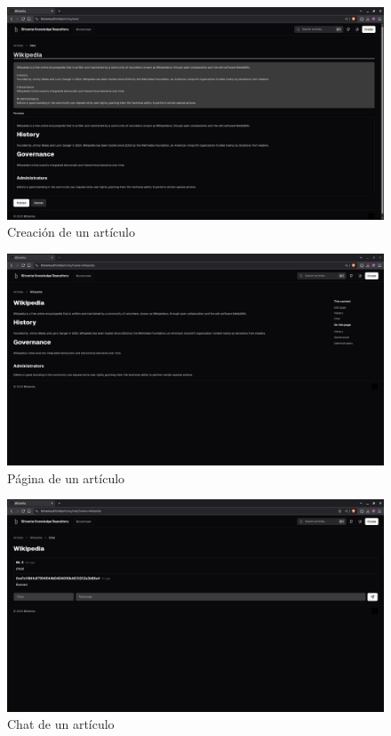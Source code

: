 \begin{figure}[H]
    \centering
    \includegraphics[width=1\linewidth]{img/frontends/create-article.png}
    \caption{Creación de un artículo}
    \label{fig:astraweb-create-article}
\end{figure}

\begin{figure}[H]
    \centering
    \includegraphics[width=1\linewidth]{img/frontends/article-page.png}
    \caption{Página de un artículo}
    \label{fig:astraweb-article-page}
\end{figure}

\begin{figure}[H]
    \centering
    \includegraphics[width=1\linewidth]{img/frontends/astraweb-chat.png}
    \caption{Chat de un artículo}
    \label{fig:astraweb-chat}
\end{figure}

